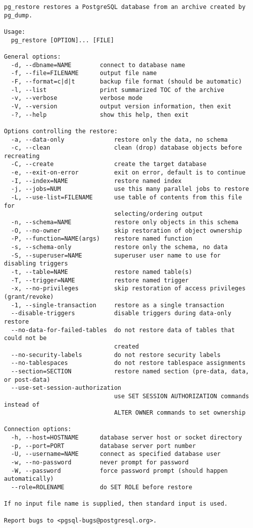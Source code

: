 \begin{verbatim}
pg_restore restores a PostgreSQL database from an archive created by pg_dump.

Usage:
  pg_restore [OPTION]... [FILE]

General options:
  -d, --dbname=NAME        connect to database name
  -f, --file=FILENAME      output file name
  -F, --format=c|d|t       backup file format (should be automatic)
  -l, --list               print summarized TOC of the archive
  -v, --verbose            verbose mode
  -V, --version            output version information, then exit
  -?, --help               show this help, then exit

Options controlling the restore:
  -a, --data-only              restore only the data, no schema
  -c, --clean                  clean (drop) database objects before recreating
  -C, --create                 create the target database
  -e, --exit-on-error          exit on error, default is to continue
  -I, --index=NAME             restore named index
  -j, --jobs=NUM               use this many parallel jobs to restore
  -L, --use-list=FILENAME      use table of contents from this file for
                               selecting/ordering output
  -n, --schema=NAME            restore only objects in this schema
  -O, --no-owner               skip restoration of object ownership
  -P, --function=NAME(args)    restore named function
  -s, --schema-only            restore only the schema, no data
  -S, --superuser=NAME         superuser user name to use for disabling triggers
  -t, --table=NAME             restore named table(s)
  -T, --trigger=NAME           restore named trigger
  -x, --no-privileges          skip restoration of access privileges (grant/revoke)
  -1, --single-transaction     restore as a single transaction
  --disable-triggers           disable triggers during data-only restore
  --no-data-for-failed-tables  do not restore data of tables that could not be
                               created
  --no-security-labels         do not restore security labels
  --no-tablespaces             do not restore tablespace assignments
  --section=SECTION            restore named section (pre-data, data, or post-data)
  --use-set-session-authorization
                               use SET SESSION AUTHORIZATION commands instead of
                               ALTER OWNER commands to set ownership

Connection options:
  -h, --host=HOSTNAME      database server host or socket directory
  -p, --port=PORT          database server port number
  -U, --username=NAME      connect as specified database user
  -w, --no-password        never prompt for password
  -W, --password           force password prompt (should happen automatically)
  --role=ROLENAME          do SET ROLE before restore

If no input file name is supplied, then standard input is used.

Report bugs to <pgsql-bugs@postgresql.org>.

\end{verbatim}


